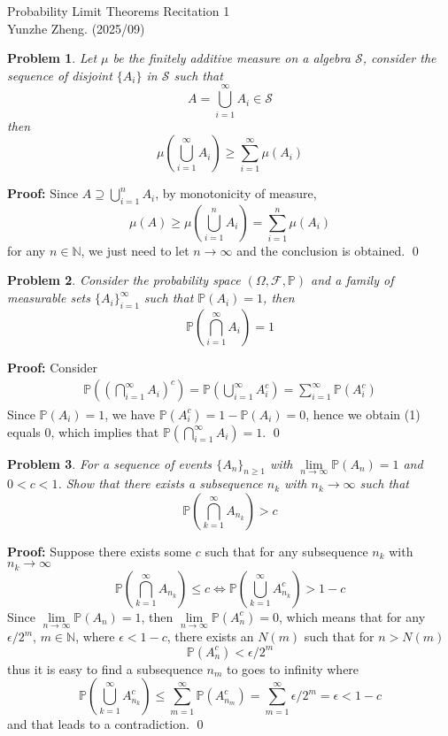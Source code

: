 \documentclass[12pt]{article}
\newtheorem{problem}{Problem}
\begin{document}
\noindent Probability Limit Theorems \hfill Recitation 1\\
Yunzhe Zheng. (2025/09)

\hrulefill

\begin{problem}
    Let $\mu$ be the finitely additive measure on a algebra $\mathcal{S}$, consider the sequence of disjoint $\{A_i\}$ in $\mathcal{S}$ such that
    $$
        A=\bigcup_{i=1}^\infty A_i\in \mathcal{S}
    $$
    then 
    $$
        \mu\left(\bigcup_{i=1}^\infty A_i\right)\geq \sum\limits_{i=1}^\infty\mu(A_i)
    $$
\end{problem}

\textbf{Proof:} Since $A\supseteq\bigcup\limits_{i=1}^n A_i$, by monotonicity of measure, 
$$
    \mu(A)\geq\mu\left(\bigcup_{i=1}^{n}A_i\right)=\sum\limits_{i=1}^n\mu(A_i)
$$ for any $n\in\mathbb{N}$, we just need to let $n\to\infty$ and the conclusion is obtained. \qed
\\
\begin{problem}
    Consider the probability space $(\Omega, \mathcal{F}, \mathbb{P})$ and a family of measurable sets $\{A_i\}_{i=1}^\infty$ such that $\mathbb{P}(A_i)=1$, then 
    $$
        \mathbb{P}\left(\bigcap_{i=1}^\infty A_i\right) = 1
    $$
\end{problem}

\textbf{Proof:} Consider 
\begin{align}
    \mathbb{P}\left(\left(\bigcap\limits_{i=1}^\infty A_i\right)^c\right)= \mathbb{P}\left(\bigcup_{i=1}^\infty A_i^c\right)=\sum\limits_{i=1}^\infty \mathbb{P}(A_i^c)
\end{align}
Since $\mathbb{P}(A_i)=1$, we have $\mathbb{P}(A_i^c)=1-\mathbb{P}(A_i)=0$, hence we obtain (1) equals $0$, which implies that $\mathbb{P}\left(\bigcap\limits_{i=1}^\infty A_i\right)=1$. \qed
\\
\begin{problem}
    For a sequence of events $\{A_n\}_{n\geq 1}$ with $\lim\limits_{n\to\infty}\mathbb{P}(A_n)=1$ and $0<c<1$. Show that there exists a subsequence $n_k$ with $n_k\to\infty$ such that 
    $$
        \mathbb{P}\left(\bigcap_{k=1}^\infty A_{n_k}\right)>c
    $$
\end{problem}

\textbf{Proof:} Suppose there exists some $c$ such that for any subsequence $n_k$ with $n_k\to\infty$
$$
    \mathbb{P}\left(\bigcap_{k=1}^\infty A_{n_k}\right)\leq c \iff \mathbb{P}\left(\bigcup_{k=1}^\infty A_{n_k}^c\right)>1-c
$$
Since $\lim\limits_{n\to\infty}\mathbb{P}(A_n)=1$, then $\lim\limits_{n\to\infty}\mathbb{P}(A_n^c)=0$, which means that for any $\epsilon/2^m$, $m\in\mathbb{N}$, where $\epsilon<1-c$, there exists an $N(m)$ such that for $n>N(m)$
$$
    \mathbb{P}(A_n^c)<\epsilon/2^m
$$
thus it is easy to find a subsequence $n_m$ to goes to infinity where
$$
    \mathbb{P}\left(\bigcup_{k=1}^\infty A_{n_k}^c\right)\leq\sum\limits_{m=1}^\infty\mathbb{P}(A_{n_m}^c)=\sum\limits_{m=1}^\infty\epsilon/2^m=\epsilon<1-c
$$ and that leads to a contradiction. \qed
\end{document}
